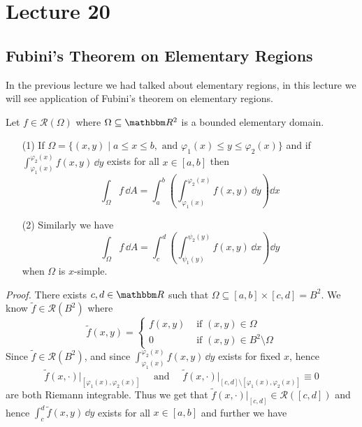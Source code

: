 \documentclass[Analysis-3]{subfiles}
\begin{document}
\chapter*{Lecture 20} %
\setcounter{chapter}{20} %

\section{Fubini's Theorem on Elementary Regions}

In the previous lecture we had talked about elementary regions, in this lecture we will see application of Fubini's theorem on elementary regions. 

\begin{Thm}{}{}\label{thm1:20}
    Let $f \in \mathscr{R}(\Omega)$ where $\Omega \subseteq \R^2$ is a bounded elementary domain. 
    \begin{enumerate}
        \item[(1)] If $\Omega = \{ (x,y) \mid a \leq x \leq b, \mbox{ and } \varphi_1(x) \leq y \leq \varphi_2(x) \}$ and if $\displaystyle{\int_{\varphi_1(x)}^{\varphi_2(x)}f(x,y) \, \dd y}$ exists for all $x \in [a,b]$ then 
        \[
            \int_{\Omega} f \, \dd A = \int_a^b \left( \int_{\varphi_1(x)}^{\varphi_2(x)} f(x,y) \, \dd y\right) \dd x    
        \]

        \item[(2)] Similarly we have 
        \[
            \int_{\Omega} f \, \dd A = \int_c^d \left( \int_{\psi_1(y)}^{\psi_2(y)} f(x,y) \, \dd x\right) \dd y    
        \]
        when $\Omega$ is $x$-simple. 
    \end{enumerate}
\end{Thm}
\textit{Proof.} There exists $c,d \in \R$ such that $\Omega \subseteq [a,b] \times [c,d] = B^2$. We know $\tilde{f} \in \mathscr{R}(B^2)$ where 
\[
    \tilde{f}(x,y) = \begin{cases}
        f(x,y) & \mbox{ if } (x,y) \in \Omega \\ 
        0 & \mbox{ if } (x,y) \in B^2 \setminus \Omega
    \end{cases}    
\]
Since $\tilde{f} \in \mathscr{R}(B^2)$, and since $\displaystyle{\int_{\varphi_1(x)}^{\varphi_2(x)} f(x,y) \, \dd y}$ exists for fixed $x$, hence 
\[
    \tilde{f}(x,\cdot)\big\vert_{[\varphi_1(x),\varphi_2(x)]} \quad \mbox{ and } \quad \tilde{f}(x,\cdot)\big\vert_{[c,d]\setminus[\varphi_1(x),\varphi_2(x)]} \equiv 0    
\]
are both Riemann integrable. Thus we get that $\tilde{f}(x,\cdot)\vert_{[c,d]} \in \mathscr{R}([c,d])$ and hence $\displaystyle{\int_c^d \tilde{f}(x,y) \, \dd y}$ exists for all $x \in [a,b]$ and further we have 
\end{document}
